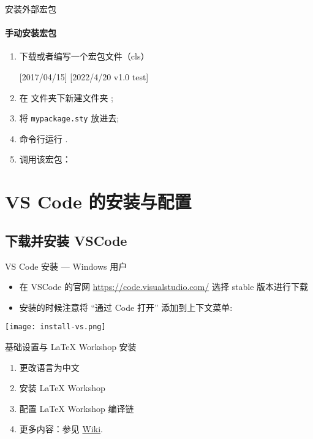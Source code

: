 \begin{frame}[fragile]{安装外部宏包}
\framesubtitle{手动安装宏包}

\begin{enumerate}
  \item 下载或者编写一个宏包文件（cls） 
    \begin{latexcode}
    [2017/04/15]
    [2022/4/20 v1.0 test]
    \newcommand{\mycmd}{Hello \LaTeX}  
    \end{latexcode}
  \item 在  文件夹下新建文件夹 ;
  \item 将 \texttt{mypackage.sty} 放进去;
  \item 命令行运行 .
  \item 调用该宏包：
\end{enumerate}
\end{frame}


\section{VS Code 的安装与配置}
\subsection{下载并安装 VSCode}
\begin{frame}[fragile]{VS Code 安装 --- Windows 用户}
  \begin{itemize}
    \item 在 VSCode 的官网 \href{https://code.visualstudio.com/}{https://code.visualstudio.com/} 选择 stable 版本进行下载
    \item 安装的时候注意将 ``通过 Code 打开'' 添加到上下文菜单:
  \end{itemize}

  \begin{center}
    \texttt{[image: install-vs.png]}
  \end{center}

\end{frame}

\begin{frame}{基础设置与 LaTeX Workshop 安装}
  \begin{enumerate}
    \item 更改语言为中文
    \item 安装 LaTeX Workshop
    \item 配置 LaTeX Workshop 编译链
    \item 更多内容：参见 \href{https://gitee.com/xkwxdyy/CCNUthesis/wikis/\%E5\%B8\%B8\%E8\%A7\%81\%E9\%97\%AE\%E9\%A2\%98FAQ/\%E5\%A6\%82\%E4\%BD\%95\%E5\%AE\%89\%E8\%A3\%85\%E3\%80\%81\%E9\%85\%8D\%E7\%BD\%AE\%E5\%92\%8C\%E4\%BD\%BF\%E7\%94\%A8VScode\#config-LW}{Wiki}. 
  \end{enumerate}
\end{frame}